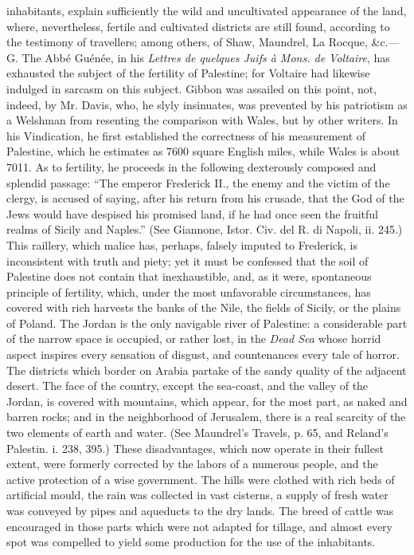 {inhabitants, explain sufficiently the wild and uncultivated
appearance of the land, where, nevertheless, fertile and
cultivated districts are still found, according to the testimony
of travellers; among others, of Shaw, Maundrel, La Rocque, \&c.—G.
The Abbé Guénée, in his \textit{Lettres de quelques Juifs à Mons. de
Voltaire}, has exhausted the subject of the fertility of
Palestine; for Voltaire had likewise indulged in sarcasm on this
subject. Gibbon was assailed on this point, not, indeed, by Mr.
Davis, who, he slyly insinuates, was prevented by his patriotism
as a Welshman from resenting the comparison with Wales, but by
other writers. In his Vindication, he first established the
correctness of his measurement of Palestine, which he estimates
as 7600 square English miles, while Wales is about 7011. As to
fertility, he proceeds in the following dexterously composed and
splendid passage: “The emperor Frederick II., the enemy and the
victim of the clergy, is accused of saying, after his return from
his crusade, that the God of the Jews would have despised his
promised land, if he had once seen the fruitful realms of Sicily
and Naples.” (See Giannone, Istor. Civ. del R. di Napoli, ii.
245.) This raillery, which malice has, perhaps, falsely imputed
to Frederick, is inconsistent with truth and piety; yet it must
be confessed that the soil of Palestine does not contain that
inexhaustible, and, as it were, spontaneous principle of
fertility, which, under the most unfavorable circumstances, has
covered with rich harvests the banks of the Nile, the fields of
Sicily, or the plains of Poland. The Jordan is the only navigable
river of Palestine: a considerable part of the narrow space is
occupied, or rather lost, in the \textit{Dead Sea} whose horrid aspect
inspires every sensation of disgust, and countenances every tale
of horror. The districts which border on Arabia partake of the
sandy quality of the adjacent desert. The face of the country,
except the sea-coast, and the valley of the Jordan, is covered
with mountains, which appear, for the most part, as naked and
barren rocks; and in the neighborhood of Jerusalem, there is a
real scarcity of the two elements of earth and water. (See
Maundrel’s Travels, p. 65, and Reland’s Palestin. i. 238, 395.)
These disadvantages, which now operate in their fullest extent,
were formerly corrected by the labors of a numerous people, and
the active protection of a wise government. The hills were
clothed with rich beds of artificial mould, the rain was
collected in vast cisterns, a supply of fresh water was conveyed
by pipes and aqueducts to the dry lands. The breed of cattle was
encouraged in those parts which were not adapted for tillage, and
almost every spot was compelled to yield some production for the
use of the inhabitants.

}
